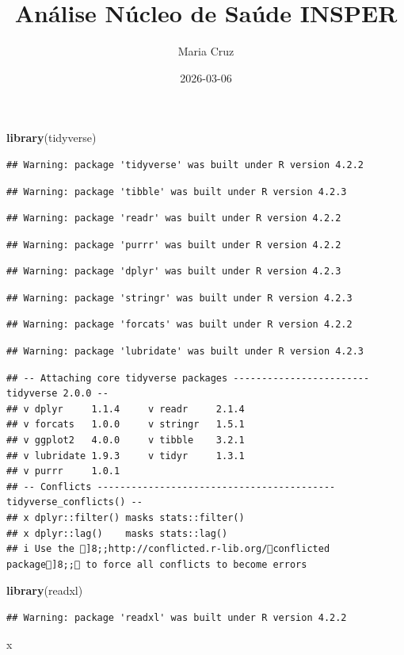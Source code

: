 \documentclass[
]{article}
\title{Análise Núcleo de Saúde INSPER}
\author{Maria Cruz}
\date{2026-03-06}
\newenvironment{Shaded}{\begin{snugshade}}{\end{snugshade}}
\newcommand{\FunctionTok}[1]{\textcolor[rgb]{0.13,0.29,0.53}{\textbf{#1}}}
\newcommand{\NormalTok}[1]{#1}
\begin{document}
\maketitle

\begin{Shaded}
\begin{Highlighting}[]
\FunctionTok{library}\NormalTok{(tidyverse)}
\end{Highlighting}
\end{Shaded}

\begin{verbatim}
## Warning: package 'tidyverse' was built under R version 4.2.2
\end{verbatim}

\begin{verbatim}
## Warning: package 'tibble' was built under R version 4.2.3
\end{verbatim}

\begin{verbatim}
## Warning: package 'readr' was built under R version 4.2.2
\end{verbatim}

\begin{verbatim}
## Warning: package 'purrr' was built under R version 4.2.2
\end{verbatim}

\begin{verbatim}
## Warning: package 'dplyr' was built under R version 4.2.3
\end{verbatim}

\begin{verbatim}
## Warning: package 'stringr' was built under R version 4.2.3
\end{verbatim}

\begin{verbatim}
## Warning: package 'forcats' was built under R version 4.2.2
\end{verbatim}

\begin{verbatim}
## Warning: package 'lubridate' was built under R version 4.2.3
\end{verbatim}

\begin{verbatim}
## -- Attaching core tidyverse packages ------------------------ tidyverse 2.0.0 --
## v dplyr     1.1.4     v readr     2.1.4
## v forcats   1.0.0     v stringr   1.5.1
## v ggplot2   4.0.0     v tibble    3.2.1
## v lubridate 1.9.3     v tidyr     1.3.1
## v purrr     1.0.1     
## -- Conflicts ------------------------------------------ tidyverse_conflicts() --
## x dplyr::filter() masks stats::filter()
## x dplyr::lag()    masks stats::lag()
## i Use the ]8;;http://conflicted.r-lib.org/conflicted package]8;; to force all conflicts to become errors
\end{verbatim}

\begin{Shaded}
\begin{Highlighting}[]
\FunctionTok{library}\NormalTok{(readxl)}
\end{Highlighting}
\end{Shaded}

\begin{verbatim}
## Warning: package 'readxl' was built under R version 4.2.2
\end{verbatim}

x
\end{document}
